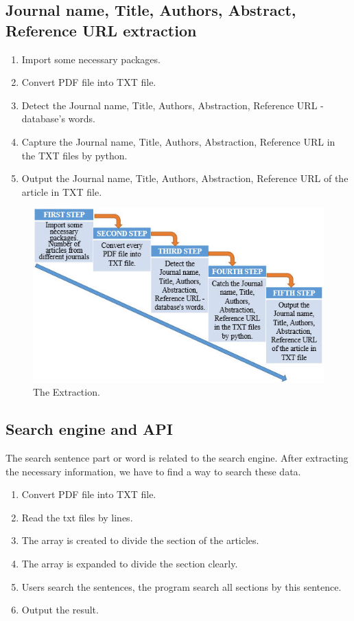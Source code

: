 	\subsection*{Journal name, Title, Authors, Abstract, Reference URL extraction}
		\begin{enumerate}
			\item Import some necessary packages.
			\item Convert PDF file into TXT file.
			\item Detect the Journal name, Title, Authors, Abstraction, Reference URL -database's words.
			\item Capture the Journal name, Title, Authors, Abstraction, Reference URL in the TXT files by python.
			\item Output the Journal name, Title, Authors, Abstraction, Reference URL of the article in TXT file.
		\end{enumerate}	

\begin{figure}[tbh]
	\begin{center}
		\includegraphics[width=\columnwidth]{Union_Method_Chart_Extraction}
	\end{center}
	\caption{The Extraction.}
\end{figure}

	\subsection*{Search engine and API}
	The search sentence part or word is related to the search engine. 
	After extracting the necessary information, we have to find a way to search these data.
		\begin{enumerate}
			\item Convert PDF file into TXT file.
			\item Read the txt files by lines.
			\item The array is created to divide the section of the articles.
			\item The array is expanded to divide the section clearly.
			\item Users search the sentences, the program search all sections by this sentence.
			\item Output the result.
		\end{enumerate}	

